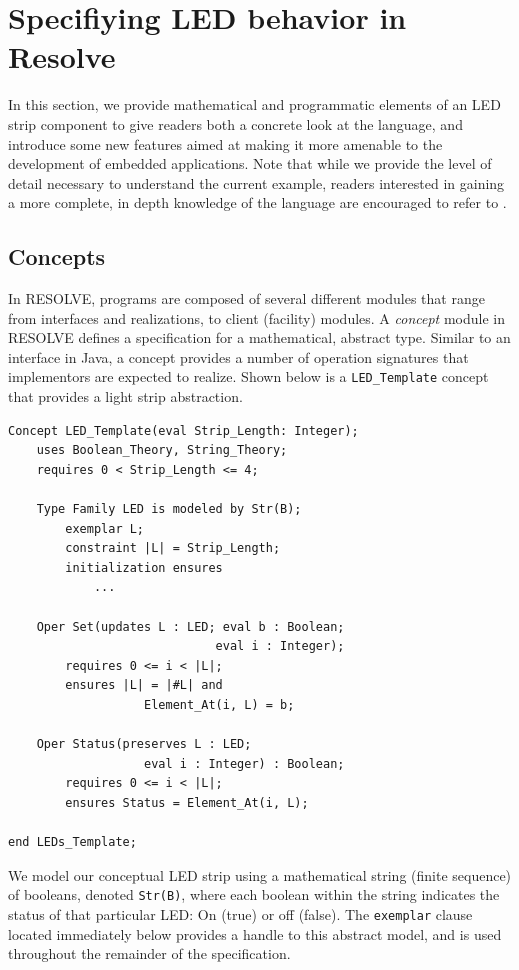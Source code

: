 \section{Specifiying LED behavior in Resolve}
\label{sec:specifiying}

In this section, we provide mathematical and programmatic elements of an LED strip component to give readers both a concrete look at the language, and introduce some new features aimed at making it more amenable to the development of embedded applications. Note that while we provide the level of detail necessary to understand the current example, readers interested in gaining a more complete, in depth knowledge of the language are encouraged to refer to \cite{sitaraman:2011, kulczycki:2008}.

\subsection{Concepts}
\label{ssec:concepts}
In RESOLVE, programs are composed of several different modules that range from interfaces and realizations, to client (facility) modules. A \textit{concept} module in RESOLVE defines a specification for a mathematical, abstract type. Similar to an interface in Java, a concept provides a number of operation signatures that implementors are expected to realize. Shown below is a \texttt{LED\_Template} concept that provides a light strip abstraction.

\begin{verbatim}
Concept LED_Template(eval Strip_Length: Integer);
    uses Boolean_Theory, String_Theory;
    requires 0 < Strip_Length <= 4;
	
    Type Family LED is modeled by Str(B);
        exemplar L;
        constraint |L| = Strip_Length;
        initialization ensures 
            ...
    
    Oper Set(updates L : LED; eval b : Boolean; 
                             eval i : Integer);
        requires 0 <= i < |L|;
        ensures |L| = |#L| and 
                   Element_At(i, L) = b;
    
    Oper Status(preserves L : LED; 
                   eval i : Integer) : Boolean;
        requires 0 <= i < |L|;
        ensures Status = Element_At(i, L);
        
end LEDs_Template;
\end{verbatim}

We model our conceptual LED strip using a mathematical string (finite sequence) of booleans, denoted \texttt{Str(B)}, where each boolean within the string indicates the status of that particular LED: On (true) or off (false). The \texttt{exemplar} clause located immediately below provides a handle to this abstract model, and is used throughout the remainder of the specification.

